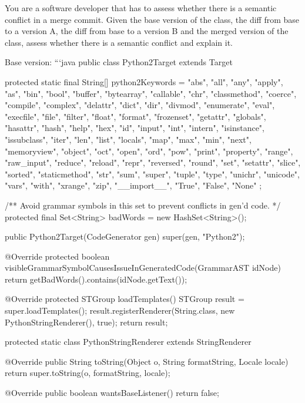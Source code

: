 \begin{prompt}
  You are a software developer that has to assess whether there is a semantic conflict in a merge commit.  Given the base version of the class, the diff from base to a version A, the diff from base to a version B and the merged version of the class, assess whether there is a semantic conflict and explain it.

  Base version:
  ```java
  public class Python2Target extends Target {
    protected static final String[] python2Keywords = {
      "abs", "all", "any", "apply", "as",
      "bin", "bool", "buffer", "bytearray",
      "callable", "chr", "classmethod", "coerce", "compile", "complex",
      "delattr", "dict", "dir", "divmod",
      "enumerate", "eval", "execfile",
      "file", "filter", "float", "format", "frozenset",
      "getattr", "globals",
      "hasattr", "hash", "help", "hex",
      "id", "input", "int", "intern", "isinstance", "issubclass", "iter",
      "len", "list", "locals",
      "map", "max", "min", "next",
      "memoryview",
      "object", "oct", "open", "ord",
      "pow", "print", "property",
      "range", "raw_input", "reduce", "reload", "repr", "reversed", "round",
      "set", "setattr", "slice", "sorted", "staticmethod", "str", "sum", "super",
      "tuple", "type",
      "unichr", "unicode",
      "vars",
      "with",
      "xrange",
      "zip",
      "__import__",
      "True", "False", "None"
    };
  
    /** Avoid grammar symbols in this set to prevent conflicts in gen'd code. */
    protected final Set<String> badWords = new HashSet<String>();
  
    public Python2Target(CodeGenerator gen) {
      super(gen, "Python2");
    }
  
    @Override
    protected boolean visibleGrammarSymbolCausesIssueInGeneratedCode(GrammarAST idNode) {
      return getBadWords().contains(idNode.getText());
    }
  
    @Override
    protected STGroup loadTemplates() {
      STGroup result = super.loadTemplates();
      result.registerRenderer(String.class, new PythonStringRenderer(), true);
      return result;
    }
  
    protected static class PythonStringRenderer extends StringRenderer {
  
      @Override
      public String toString(Object o, String formatString, Locale locale) {
        return super.toString(o, formatString, locale);
      }
    }
  
    @Override
    public boolean wantsBaseListener() {
      return false;
    }
  
}
\end{prompt}
